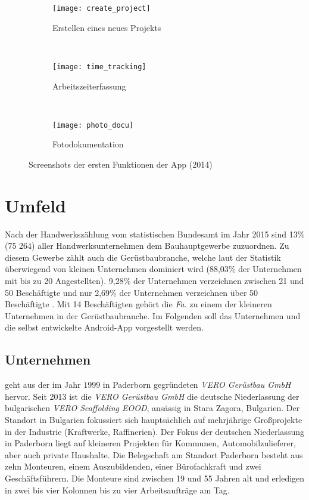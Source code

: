 \begin{figure}[h]
  \begin{subfigure}[t]{0.3\textwidth}
    \centering
    \texttt{[image: create\_project]}
    \caption{Erstellen eines neues Projekts}
  \end{subfigure}
  ~
  \begin{subfigure}[t]{0.3\textwidth}
    \centering
    \texttt{[image: time\_tracking]}
    \caption{Arbeitszeiterfassung}
  \end{subfigure}
  ~
  \begin{subfigure}[t]{0.3\textwidth}
    \centering
    \texttt{[image: photo\_docu]}
    \caption{Fotodokumentation}
  \end{subfigure}
  \centering
  \caption{Screenshots der ersten Funktionen der App (2014)}
  \label{fig:app14}
\end{figure}

\section{Umfeld}
Nach der Handwerkszählung vom statistischen Bundesamt im Jahr 2015 sind 13\% (75 264) aller Handwerksunternehmen dem Bauhauptgewerbe zuzuordnen.
Zu diesem Gewerbe zählt auch die Gerüstbaubranche, welche laut der Statistik überwiegend von kleinen Unternehmen dominiert wird (88,03\% der Unternehmen mit bis zu 20 Angestellten). 
9,28\% der Unternehmen verzeichnen zwischen 21 und 50 Beschäftigte und nur 2,69\% der Unternehmen verzeichnen über 50 Beschäftigte \cite{HZ17}.
Mit 14 Beschäftigten gehört die \emph{Fa.} \vr{} zu einem der kleineren Unternehmen in der Gerüstbaubranche.
Im Folgenden soll das Unternehmen und die selbst entwickelte Android-App vorgestellt werden.

\subsection{Unternehmen}
\vr{} geht aus der im Jahr $1999$ in Paderborn gegründeten \emph{VERO Gerüstbau GmbH} hervor. 
Seit 2013 ist die \emph{VERO Gerüstbau GmbH} die deutsche Niederlassung der bulgarischen \emph{VERO Scaffolding EOOD}, ansässig in Stara Zagora, Bulgarien.
Der Standort in Bulgarien fokussiert sich hauptsächlich auf mehrjährige Großprojekte in der Industrie (Kraftwerke, Raffinerien).
Der Fokus der deutschen Niederlassung in Paderborn liegt auf kleineren Projekten für Kommunen, Automobilzulieferer, aber auch private Haushalte.
Die Belegschaft am Standort Paderborn besteht aus zehn Monteuren, einem Auszubildenden, einer Bürofachkraft und zwei Geschäftsführern.
Die Monteure sind zwischen 19 und 55 Jahren alt und erledigen in zwei bis vier Kolonnen bis zu vier Arbeitsaufträge am Tag.

